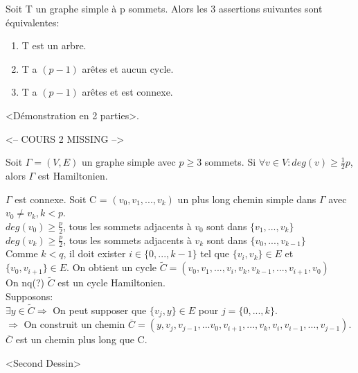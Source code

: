 \begin{thrm}
Soit T un graphe simple à p sommets. Alors les 3 assertions suivantes sont équivalentes:
	\begin{enumerate}
	\item T est un arbre.
	\item T a $(p-1)$ arêtes et aucun cycle.
	\item T a $(p-1)$ arêtes et est connexe.
	\end{enumerate}
\end{thrm}

\begin{demo}
<Démonstration en 2 parties>.
\end{demo}


\newpage
<-- COURS 2 MISSING -->
\newpage

\begin{thrm}[Dirac 1950]
Soit $\Gamma = (V,E)$ un graphe simple avec $p \geq 3$ sommets. Si $\forall v \in V: deg(v) \geq \frac{1}{2}p$, alors $\Gamma$ est Hamiltonien.
\end{thrm}

\begin{demo}
$\Gamma$ est connexe. Soit C = $(v_{0},v_{1},...,v_{k})$ un plus long chemin simple dans $\Gamma$ avec $v_{0} \neq v_{k}, k < p$.\\

$ deg(v_{0}) \geq \frac{p}{2}$, tous les sommets adjacents à $v_{0}$ sont dans $\{v_{1},...,v_{k}\}$\\

$ deg(v_{k}) \geq \frac{p}{2}$, tous les sommets adjacents à $v_{k}$ sont dans $\{v_{0},...,v_{k-1}\}$\\

Comme $k < q$, il doit exister $i \in \{0,...,k-1\}$ tel que $\{v_{i},v_{k}\} \in E$ et $\{v_{0},v_{i+1}\} \in E$. On obtient un cycle $\widetilde{C} = (v_{0},v_{1},...,v_{i},v_{k},v_{k-1},...,v_{i+1},v_{0})$ \\



On nq(?) $\widetilde{C}$ est un cycle Hamiltonien.\\

Supposons:\\

$\exists  y \in \widetilde{C} \Rightarrow$ On peut supposer que $\{ v_{j},y\} \in E$ pour $j=\{0,...,k\}$.\\

$\Rightarrow$ On construit un chemin $\overline{C} = (y, v_{j},v_{j-1},...v_{0},v_{i+1},...,v_{k},v_{i},v_{i-1},...,v_{j-1})$. $\overline{C}$ est un chemin plus long que C.

<Second Dessin>

\end{demo}

